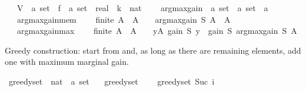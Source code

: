 \begin{isabellebody}
\ \ \ V\ {\isacharcolon}{\kern0pt}{\isacharcolon}{\kern0pt}\ {\isachardoublequoteopen}{\isacharprime}{\kern0pt}a\ set{\isachardoublequoteclose}\ \ f\ {\isacharcolon}{\kern0pt}{\isacharcolon}{\kern0pt}\ {\isachardoublequoteopen}{\isacharprime}{\kern0pt}a\ set\ {\isasymRightarrow}\ real{\isachardoublequoteclose}\ \ k\ {\isacharcolon}{\kern0pt}{\isacharcolon}{\kern0pt}\ nat\ {\isacharplus}{\kern0pt}\isanewline
\ \ \ argmax{\isacharunderscore}{\kern0pt}gain\ {\isacharcolon}{\kern0pt}{\isacharcolon}{\kern0pt}\ {\isachardoublequoteopen}{\isacharprime}{\kern0pt}a\ set\ {\isasymRightarrow}\ {\isacharprime}{\kern0pt}a\ set\ {\isasymRightarrow}\ {\isacharprime}{\kern0pt}a{\isachardoublequoteclose}\isanewline
\ \ \ argmax{\isacharunderscore}{\kern0pt}gain{\isacharunderscore}{\kern0pt}mem{\isacharcolon}{\kern0pt}\isanewline
\ \ \ \ {\isachardoublequoteopen}finite\ A\ {\isasymLongrightarrow}\ A\ {\isasymnoteq}\ {\isacharbraceleft}{\kern0pt}{\isacharbraceright}{\kern0pt}\ {\isasymLongrightarrow}\ argmax{\isacharunderscore}{\kern0pt}gain\ S\ A\ {\isasymin}\ A{\isachardoublequoteclose}\isanewline
\ \ \ argmax{\isacharunderscore}{\kern0pt}gain{\isacharunderscore}{\kern0pt}max{\isacharcolon}{\kern0pt}\isanewline
\ \ \ \ {\isachardoublequoteopen}finite\ A\ {\isasymLongrightarrow}\ A\ {\isasymnoteq}\ {\isacharbraceleft}{\kern0pt}{\isacharbraceright}{\kern0pt}\ {\isasymLongrightarrow}\ {\isasymforall}y{\isasymin}A{\isachardot}{\kern0pt}\ gain\ S\ y\ {\isasymle}\ gain\ S\ {\isacharparenleft}{\kern0pt}argmax{\isacharunderscore}{\kern0pt}gain\ S\ A{\isacharparenright}{\kern0pt}{\isachardoublequoteclose}\isanewline
{}%
\begin{isamarkuptext}%
Greedy construction: start from \isa{{\isacharbraceleft}{\kern0pt}{\isacharbraceright}{\kern0pt}} and, as long as there are remaining
  elements, add one with maximum marginal gain.%
\end{isamarkuptext}\isamarkuptrue%
\isamarkupfalse%
\ greedy{\isacharunderscore}{\kern0pt}set\ {\isacharcolon}{\kern0pt}{\isacharcolon}{\kern0pt}\ {\isachardoublequoteopen}nat\ {\isasymRightarrow}\ {\isacharprime}{\kern0pt}a\ set{\isachardoublequoteclose}\ \isanewline
\ \ {\isachardoublequoteopen}greedy{\isacharunderscore}{\kern0pt}set\ {}\ {\isacharequal}{\kern0pt}\ {\isacharbraceleft}{\kern0pt}{\isacharbraceright}{\kern0pt}{\isachardoublequoteclose}\isanewline
{\isacharbar}{\kern0pt}\ {\isachardoublequoteopen}greedy{\isacharunderscore}{\kern0pt}set\ {\isacharparenleft}{\kern0pt}Suc\ i{\isacharparenright}{\kern0pt}\ {\isacharequal}{\kern0pt}\isanewline

\end{isabellebody}
